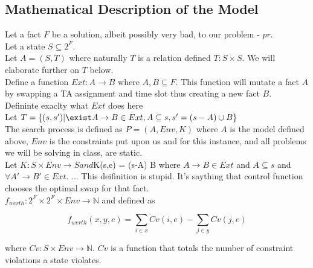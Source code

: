 \documentclass{article}
\begin{document}
\subsection{Mathematical Description of the Model}


Let a fact $F$ be a solution, albeit possibly very bad, to our problem
- $pr$.\\

Let a state $S \subseteq 2^F$.\\

Let $A = (S, T)$ where naturally $T$ is a relation defined $T: S
\times S$. We will elaborate further on $T$ below.\\

Define a function $Ext: A \rightarrow B$ where $A,B \subseteq F$. This
function will mutate a fact $A$ by swapping a TA assignment and time
slot thus creating a new fact $B$.\\

Defininte exaclty what $Ext$ does here\\

Let $T = \{(s,s') | \exist A \rightarrow B \in Ext , A \subseteq s ,
s' = (s - A) \cup B\}$\\

The search process is defined as $P = (A, Env, K)$ where $A$ is the
model defined above, $Env$ is the constraints put upon us and for this
instance, and all problems we will be solving in class, are static.\\

Let $K: S \times Env \rightarrow S and $K(s,e) = (s-A) \cup B where $A
\rightarrow B \in Ext$ and $A \subseteq s$ and $\forall A' \rightarrow
B' \in Ext.$ ... This deifinition is stupid. It's saything that
control function chooses the optimal swap for that fact.\\

$f_{werth}: 2^F \times 2^F \times Env \rightarrow \mathbb{N}$ and
defined as

\[
f_{werth}(x, y, e) = \sum_{i \in x}Cv(i, e) - \sum_{j \in y}Cv(j, e)
\]

where $Cv: S \times Env \rightarrow \mathbb{N}$. $Cv$ is a function
that totals the number of constraint violations a state violates.
\end{document}
